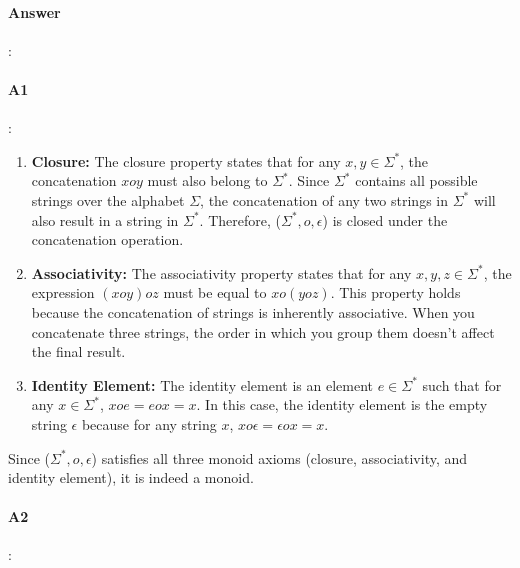 \documentclass{article}
\begin{document}
\paragraph{Answer}:

\paragraph{A1}:

\begin{enumerate}
  \item \textbf{Closure:} The closure property states that for any $x, y \in \Sigma^*$, the concatenation $x o y$ must also belong to $\Sigma^*$. Since $\Sigma^*$ contains all possible strings over the alphabet $\Sigma$, the concatenation of any two strings in $\Sigma^*$ will also result in a string in $\Sigma^*$. Therefore, ($\Sigma^*, o, \epsilon$) is closed under the concatenation operation.
  \item \textbf{Associativity:} The associativity property states that for any $x, y, z \in \Sigma^*$, the expression $(x o y) o z$ must be equal to $x o (y o z)$. This property holds because the concatenation of strings is inherently associative. When you concatenate three strings, the order in which you group them doesn't affect the final result.
  \item \textbf{Identity Element:} The identity element is an element $e \in \Sigma^*$ such that for any $x \in \Sigma^*$, $x o e = e o x = x$. In this case, the identity element is the empty string $\epsilon$ because for any string $x$, $x o \epsilon = \epsilon o x = x$.

\end{enumerate}

Since ($\Sigma^*, o, \epsilon$) satisfies all three monoid axioms (closure, associativity, and identity element), it is indeed a monoid.

\paragraph{A2}:

\end{document}
